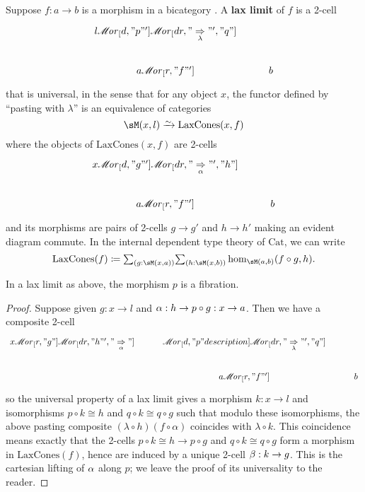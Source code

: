 \documentclass{amsart}
\let\To\Rightarrow
\def\ar#1{\mathscr{M}\!\mathit{or}_{#1}}
\begin{document}
\begin{defn}
  Suppose $f:a\to b$ is a morphism in a bicategory \sM.
  A \textbf{lax limit} of $f$ is a 2-cell
  \[
  \begin{tikzcd}
    l \ar[d,"p"'] \ar[dr,"\underset{\lambda}{\To}"',"q"] \\ a \ar[r,"f"'] & b
  \end{tikzcd}
  \]
  that is universal, in the sense that for any object $x$, the functor defined by ``pasting with $\lambda$'' is an equivalence of categories
  \[ \sM(x,l) \toiso \mathrm{LaxCones}(x,f) \]
  where the objects of $\mathrm{LaxCones}(x,f)$ are 2-cells
  \[
  \begin{tikzcd}
    x \ar[d,"g"'] \ar[dr,"\underset{\al}{\To}"',"h"] \\ a \ar[r,"f"'] & b
  \end{tikzcd}
  \]
  and its morphisms are pairs of 2-cells $g\to g'$ and $h\to h'$ making an evident diagram commute.
  In the internal dependent type theory of $\mathrm{Cat}$, we can write
  \[\mathrm{LaxCones}(f)\coloneqq
  \tsm{g:\sM(x,a)}{h:\sM(x,b)} \hom_{\sM(a,b)}(f\circ g,h).
  \]
\end{defn}

\begin{lem}
  In a lax limit as above, the morphism $p$ is a fibration.
\end{lem}
\begin{proof}
  Suppose given $g:x\to l$ and $\alpha:h\to p\circ g : x\to a$.
  Then we have a composite 2-cell
  \[
  \begin{tikzcd}
    x \ar[r,"g"] \ar[dr,"h"',"\underset{\al}{\To}"] &
    \ar[d,"p" description] \ar[dr,"\underset{\lambda}{\To}"',"q"] \\
    & a \ar[r,"f"'] & b
  \end{tikzcd}
  \]
  so the universal property of a lax limit gives a morphism $k:x\to l$ and isomorphisms $p\circ k \cong h$ and $q\circ k\cong q\circ g$ such that modulo these isomorphisms, the above pasting composite $(\lambda\circ h)(f\circ \alpha)$ coincides with $\lambda\circ k$.
  This coincidence means exactly that the 2-cells $p\circ k \cong h \to p\circ g$ and $q\circ k \cong q\circ g$ form a morphism in $\mathrm{LaxCones}(f)$, hence are induced by a unique 2-cell $\beta:k\to g$.
  This is the cartesian lifting of $\alpha$ along $p$; we leave the proof of its universality to the reader.
\end{proof}
\end{document}
